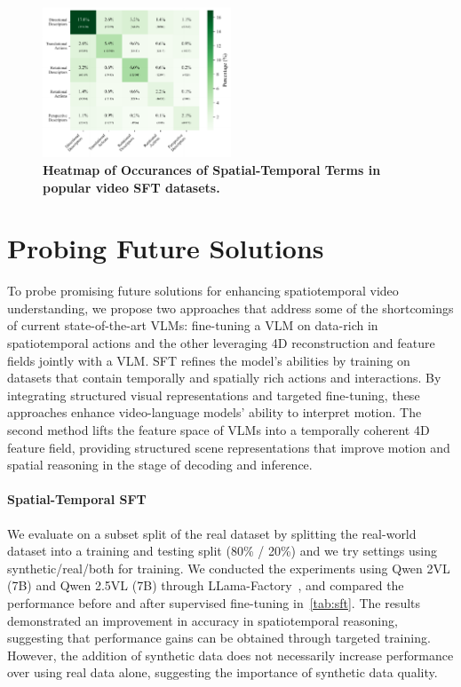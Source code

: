 \begin{figure}[b]
    \centering
    \includegraphics[width=0.5\textwidth]{figures/sft_ds_analysis.pdf}
    \caption{\textbf{Heatmap of Occurances of Spatial-Temporal Terms in popular video SFT datasets.}}
    \label{fig:sft_ds}
\end{figure}

\section{Probing Future Solutions}
To probe promising future solutions for enhancing spatiotemporal video understanding, we propose two approaches that address some of the shortcomings of current state-of-the-art VLMs: fine-tuning a VLM on data-rich in spatiotemporal actions and the other leveraging 4D reconstruction and feature fields jointly with a VLM. SFT refines the model’s abilities by training on datasets that contain temporally and spatially rich actions and interactions. By integrating structured visual representations and targeted fine-tuning, these approaches enhance video-language models’ ability to interpret motion. The second method lifts the feature space of VLMs into a temporally coherent 4D feature field, providing structured scene representations that improve motion and spatial reasoning in the stage of decoding and inference.

\paragraph{Spatial-Temporal SFT}
We evaluate on a subset split of the real dataset by splitting the real-world dataset into a training and testing split (80\% / 20\%) and we try settings using synthetic/real/both for training. We conducted the experiments using Qwen 2VL (7B) and Qwen 2.5VL (7B) through LLama-Factory~\cite{zheng2024llamafactory}, and compared the performance before and after supervised fine-tuning in~\cref{tab:sft}. The results demonstrated an improvement in accuracy in spatiotemporal reasoning, suggesting that performance gains can be obtained through targeted training. However, the addition of synthetic data does not necessarily increase performance over using real data alone, suggesting the importance of synthetic data quality.

